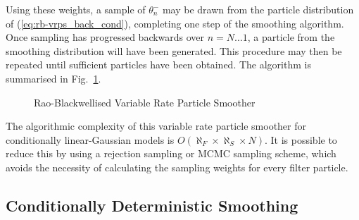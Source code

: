 \documentclass[10pt,twocolumn,twoside]{IEEEtran}
\begin{document}
Using these weights, a sample of $\theta_{n}^-$ may be drawn from the particle distribution of (\ref{eq:rb-vrps_back_cond}), completing one step of the smoothing algorithm. Once sampling has progressed backwards over $n=N \dots 1$, a particle from the smoothing distribution will have been generated. This procedure may then be repeated until sufficient particles have been obtained. The algorithm is summarised in Fig.~\ref{alg:RBVRPS}.

\begin{figure}
\caption{Rao-Blackwellised Variable Rate Particle Smoother}
\label{alg:RBVRPS}
\end{figure}

The algorithmic complexity of this variable rate particle smoother for conditionally linear-Gaussian models is $O(\aleph_F \times \aleph_S \times N)$. It is possible to reduce this by using a rejection sampling \cite{Douc2011} or MCMC \cite{Bunch2012} sampling scheme, which avoids the necessity of calculating the sampling weights for every filter particle.



\subsection{Conditionally Deterministic Smoothing} \label{sec:pd-vrps}
\end{document}
